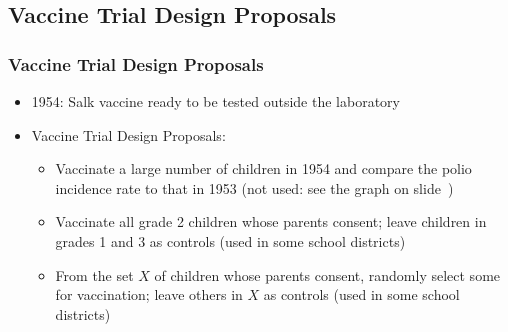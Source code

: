 \documentclass[t,xcolor=pst,dvips]{beamer}
\begin{document}
\subsection{Vaccine Trial Design Proposals}
\begin{frame}[t]\frametitle{Vaccine Trial Design Proposals}
{\footnotesize

\begin{itemize}
\item<2-> 1954: Salk vaccine ready to be tested outside the laboratory
\item<3-> Vaccine Trial Design Proposals:
   \begin{itemize}
   \item<4-> \footnotesize
     Vaccinate a large number of children in 1954 and compare the polio incidence rate to that in 1953
          (not used:  see the graph on slide~\pageref{polio})
   \item<5-> \footnotesize
   Vaccinate all grade 2 children whose parents consent; leave children in grades 1 and 3 as controls
          (used in some school districts)
   \item<6-> \footnotesize
   From the set $X$ of children whose parents consent, randomly select some for vaccination; leave
         others in $X$ as controls
         (used in some school districts)
   \end{itemize}
\end{itemize}

}
\end{frame}
\end{document}
